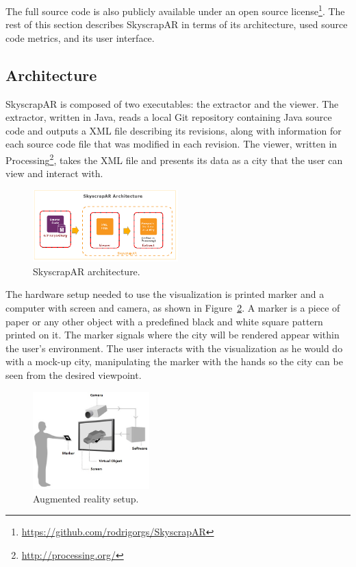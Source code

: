 The full source code is also publicly available under an open source license\footnote{\url{https://github.com/rodrigorgs/SkyscrapAR}}. The rest of this section describes SkyscrapAR in terms of its architecture, used source code metrics, and its user interface.

\subsection{Architecture} \label{sec:architecture}
SkyscrapAR is composed of two executables: the extractor and the viewer. The extractor, written in Java, reads a local Git repository containing Java source code and outputs a XML file describing its revisions, along with information for each source code file that was modified in each revision. The viewer, written in Processing\footnote{\url{http://processing.org/}}, takes the XML file and presents its data as a city that the user can view and interact with.

\begin{figure}[ht!]
 \centering
 \includegraphics[width=0.5\textwidth, bb=0 0 547 269]{./images/architecture}
 \caption{SkyscrapAR architecture.}
 \label{fig:architecture}
\end{figure}

The hardware setup needed to use the visualization is printed marker and a computer with screen and camera, as shown in Figure~\ref{fig:setup}. A marker is a piece of paper or any other object with a predefined black and white square pattern printed on it. The marker signals where the city will be rendered appear within the user's environment. The user interacts with the visualization as he would do with a mock-up city, manipulating the marker with the hands so the city can be seen from the desired viewpoint.

\begin{figure}[h!]
 \centering
 \includegraphics[width=0.4\textwidth, bb=0 0 486 406]{./images/howtowork.jpg}
 \caption{Augmented reality setup.}
 \label{fig:setup}
\end{figure}

